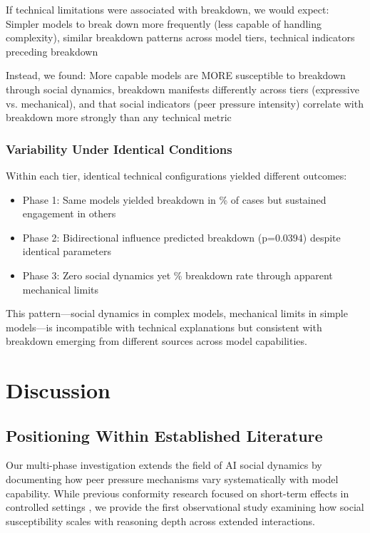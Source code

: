 \documentclass[11pt,letterpaper]{article}
\newcommand{\exponedataTotalSessionsRaw}{37}
\newcommand{\exponedataBreakdownSessionsRaw}{16}
\newcommand{\exponedataBreakdownPercentage}{%
  \fpeval{round(\exponedataBreakdownSessionsRaw / \exponedataTotalSessionsRaw * 100, 1)}\%
}
\newcommand{\exptwoBidirectionalPValue}{p=0.0394}
\newcommand{\expthreeTotalSessionsRaw}{30}
\newcommand{\expthreeBreakdownSessionsRaw}{7}
\newcommand{\expthreeBreakdownPercentage}{%
  \fpeval{round(\expthreeBreakdownSessionsRaw / \expthreeTotalSessionsRaw * 100, 1)}\%
}
\begin{document}
If technical limitations were associated with breakdown, we would expect: Simpler models to break down more frequently (less capable of handling complexity), similar breakdown patterns across model tiers, technical indicators preceding breakdown

Instead, we found: More capable models are MORE susceptible to breakdown through social dynamics, breakdown manifests differently across tiers (expressive vs. mechanical), and that social indicators (peer pressure intensity) correlate with breakdown more strongly than any technical metric

\subsubsection{Variability Under Identical Conditions}

Within each tier, identical technical configurations yielded different outcomes:
\begin{itemize}
    \item Phase 1: Same models yielded breakdown in \exponedataBreakdownPercentage{} of cases but sustained engagement in others
    \item Phase 2: Bidirectional influence predicted breakdown (\exptwoBidirectionalPValue{}) despite identical parameters
    \item Phase 3: Zero social dynamics yet \expthreeBreakdownPercentage{} breakdown rate through apparent mechanical limits
\end{itemize}

This pattern—social dynamics in complex models, mechanical limits in simple models—is incompatible with technical explanations but consistent with breakdown emerging from different sources across model capabilities.


\section{Discussion}

\subsection{Positioning Within Established Literature}

Our multi-phase investigation extends the field of AI social dynamics by documenting how peer pressure mechanisms vary systematically with model capability. While previous conformity research focused on short-term effects in controlled settings \citep{kyrlitsias2018conformity}, we provide the first observational study examining how social susceptibility scales with reasoning depth across extended interactions.
\end{document}
